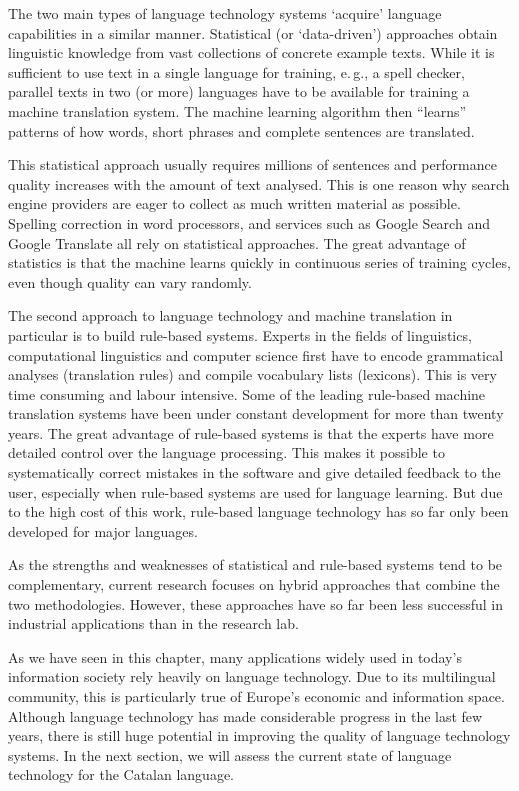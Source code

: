 \begin{multicols}{2}

    The two main types of language technology systems ‘acquire’ language capabilities in a similar manner. Statistical (or ‘data-driven’) approaches obtain linguistic knowledge from vast collections of concrete example texts. While it is sufficient to use text in a single language for training, e.\,g., a spell checker, parallel texts in two (or more) languages have to be available for training a machine translation system. The machine learning algorithm then “learns” patterns of how words, short phrases and complete sentences are translated. 

    This statistical approach usually requires millions of sentences and performance quality increases with the amount of text analysed. This is one reason why search engine providers are eager to collect as much written material as possible. Spelling correction in word processors, and services such as Google Search and Google Translate all rely on statistical approaches. The great advantage of statistics is that the machine learns quickly in continuous series of training cycles, even though quality can vary randomly.

    The second approach to language technology and machine translation in particular is to build rule-based systems. Experts in the fields of linguistics, computational linguistics and computer science first have to encode grammatical analyses (translation rules) and compile vocabulary lists (lexicons). This is very time consuming and labour intensive. Some of the leading rule-based machine translation systems have been under constant development for more than twenty years. The great advantage of rule-based systems is that the experts have more detailed control over the language processing. This makes it possible to systematically correct mistakes in the software and give detailed feedback to the user, especially when rule-based systems are used for language learning. But due to the high cost of this work, rule-based language technology has so far only been developed for major languages. 
    

    As the strengths and weaknesses of statistical and rule-based systems tend to be complementary, current research focuses on hybrid approaches that combine the two methodologies. However, these approaches have so far been less successful in industrial applications than in the research lab. 

    As we have seen in this chapter, many applications widely used in today’s information society rely heavily on language technology. Due to its multilingual community, this is particularly true of Europe’s economic and information space. Although language technology has made considerable progress in the last few years, there is still huge potential in improving the quality of language technology systems. In the next section, we will assess the current state of language technology for the Catalan language.
\end{multicols}

